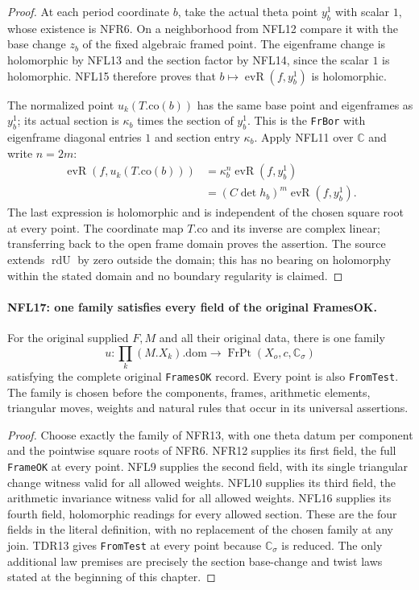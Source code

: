 \documentclass[11pt,a4paper]{article}
\numberwithin{equation}{section}
\theoremstyle{remark}\newtheorem{remark}[theorem]{Remark}
\begin{document}
\begin{proof}
At each period coordinate $b$, take the actual theta point
$y_b^1$ with scalar $1$, whose existence is NFR6.
On a neighborhood from NFL12 compare it with the base change
$z_b$ of the fixed algebraic framed point.
The eigenframe change is holomorphic by NFL13 and the section
factor by NFL14, since the scalar $1$ is holomorphic.
NFL15 therefore proves that
$b\mapsto\operatorname{evR}(f,y_b^1)$ is holomorphic.

The normalized point $u_k(T.\mathrm{co}(b))$ has the same
base point and eigenframes as $y_b^1$; its actual section is
$\kappa_b$ times the section of $y_b^1$.  This is the
\texttt{Fr\allowbreak Bor} with eigenframe diagonal entries $1$ and section
entry $\kappa_b$.  Apply NFL11 over $\mathbb C$ and write $n=2m$:
\[
 \begin{split}
 \operatorname{evR}(f,u_k(T.\mathrm{co}(b)))
   &=\kappa_b^n\operatorname{evR}(f,y_b^1)\\
   &=(C\det h_b)^m\operatorname{evR}(f,y_b^1).
 \end{split}
 \tag{NFL.24}
\]
The last expression is holomorphic and is independent of the
chosen square root at every point.  The coordinate map
$T.\mathrm{co}$ and its inverse are complex linear; transferring
back to the open frame domain proves the assertion.
The source extends $\operatorname{rdU}$ by zero outside the
domain; this has no bearing on holomorphy within the stated
domain and no boundary regularity is claimed.
\end{proof}

\paragraph{NFL17: one family satisfies every field of the original FramesOK.}
\label{claim:NFL17}
For the original supplied $F,M$ and all their original data,
there is one family
\[
 u:\prod_k(M.X_k).\mathrm{dom}\longrightarrow
       \operatorname{FrPt}(X_o,c,\mathbb C_\sigma)
\]
satisfying the complete original \texttt{Frames\allowbreak OK} record.
Every point is also \texttt{From\allowbreak Test}.
The family is chosen before the components, frames, arithmetic
elements, triangular moves, weights and natural rules that occur
in its universal assertions.

\begin{proof}
Choose exactly the family of NFR13, with one theta datum per
component and the pointwise square roots of NFR6.
NFR12 supplies its first field, the full \texttt{Frame\allowbreak OK} at
every point.  NFL9 supplies the second field, with its single
triangular change witness valid for all allowed weights.
NFL10 supplies its third field, the arithmetic invariance
witness valid for all allowed weights.  NFL16 supplies its
fourth field, holomorphic readings for every allowed section.
These are the four fields in the literal definition, with no
replacement of the chosen family at any join.
TDR13 gives \texttt{From\allowbreak Test} at every point because
$\mathbb C_\sigma$ is reduced.  The only additional law premises
are precisely the section base-change and twist laws stated
at the beginning of this chapter.
\end{proof}
\end{document}
